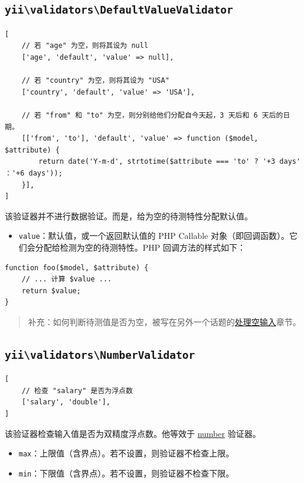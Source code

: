 \subsection{\texttt{yii{\allowbreak{}\textbackslash}validators{\allowbreak{}\textbackslash}DefaultValueValidator} \label{tutorial-core-validators.md::default}}
\lstset{language=php}\begin{lstlisting}
[
    // 若 "age" 为空，则将其设为 null
    ['age', 'default', 'value' => null],

    // 若 "country" 为空，则将其设为 "USA"
    ['country', 'default', 'value' => 'USA'],

    // 若 "from" 和 "to" 为空，则分别给他们分配自今天起，3 天后和 6 天后的日期。
    [['from', 'to'], 'default', 'value' => function ($model, $attribute) {
        return date('Y-m-d', strtotime($attribute === 'to' ? '+3 days' ：'+6 days'));
    }],
]
\end{lstlisting}
该验证器并不进行数据验证。而是，给为空的待测特性分配默认值。

\begin{itemize}
\item \lstinline|value|：默认值，或一个返回默认值的 PHP Callable 对象（即回调函数）。它们会分配给检测为空的待测特性。PHP 回调方法的样式如下：
\end{itemize}
\lstset{language=php}\begin{lstlisting}
function foo($model, $attribute) {
    // ... 计算 $value ...
    return $value;
}
\end{lstlisting}
\begin{quote}补充：如何判断待测值是否为空，被写在另外一个话题的\hyperref[input-validation.md::handling-empty-inputs]{处理空输入}章节。

\end{quote}
\subsection{\texttt{yii{\allowbreak{}\textbackslash}validators{\allowbreak{}\textbackslash}NumberValidator} \label{tutorial-core-validators.md::double}}
\lstset{language=php}\begin{lstlisting}
[
    // 检查 "salary" 是否为浮点数
    ['salary', 'double'],
]
\end{lstlisting}
该验证器检查输入值是否为双精度浮点数。他等效于 \hyperref[tutorial-core-validators.md::::number]{number} 验证器。

\begin{itemize}
\item \lstinline|max|：上限值（含界点）。若不设置，则验证器不检查上限。
\item \lstinline|min|：下限值（含界点）。若不设置，则验证器不检查下限。
\end{itemize}

